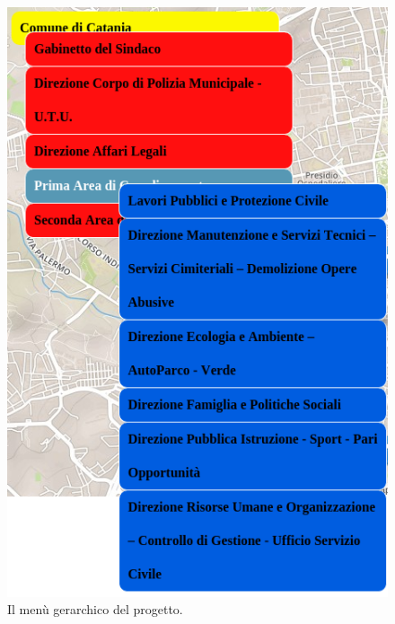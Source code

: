 \documentclass[a4paper,11pt]{article}
\begin{document}
\begin{figure}[htpb]
	\centering
	\includegraphics[scale=0.50]{menu.png}
	\caption{Il menù gerarchico del progetto.}
	\label{fig:9}
\end{figure}
\newpage
\end{document}
